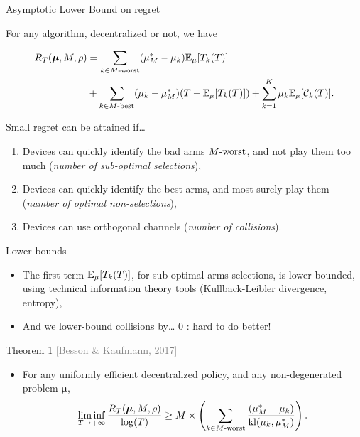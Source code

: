 \documentclass[12pt,english,ignorenonframetext,aspectratio=169,]{beamer}
\providecommand{\tightlist}{%
  \setlength{\itemsep}{0pt}\setlength{\parskip}{0pt}}
\begin{document}
\begin{frame}[allowframebreaks]{Asymptotic Lower Bound on regret}

For any algorithm, decentralized or not, we have \vspace*{-20pt}

\begin{small}\begin{align*}
R_T(\boldsymbol{\mu}, M, \rho) &= \sum_{k \in M\text{-}\mathrm{worst}} (\mu_M^* -  \mu_k) \mathbb{E}_{\mu}[T_k(T)] \\
&+ \sum_{k \in M\text{-}\mathrm{best}} (\mu_k -  \mu_M^*) (T - \mathbb{E}_{\mu}[T_k(T)]) + \sum_{k=1}^{K} \mu_k \mathbb{E}_{\mu}[\mathcal{C}_k(T)].
\end{align*}\end{small}

\begin{block}{Small regret can be attained if\ldots{}}

\begin{enumerate}
\def\labelenumi{\arabic{enumi}.}
\tightlist
\item
  Devices can quickly identify the bad arms \(M\text{-}\mathrm{worst}\), and not play
  them too much (\emph{number of sub-optimal selections}),
\item
  Devices can quickly identify the best arms, and most surely play them
  (\emph{number of optimal non-selections}),
\item
  Devices can use orthogonal channels (\emph{number of collisions}).
\end{enumerate}

\end{block}

\begin{block}{Lower-bounds}

\begin{itemize}
\tightlist
\item
  The first term \(\mathbb{E}_{\mu}[T_k(T)]\), for sub-optimal arms selections,
  is lower-bounded, using technical information theory tools
  (Kullback-Leibler divergence, entropy),
\item
  And we lower-bound collisions by\ldots{} \(0\) : hard to do better!
\end{itemize}

\end{block}

\begin{block}{Theorem 1
\hfill{}\textcolor{gray}{[Besson \& Kaufmann, 2017]}}

\begin{itemize}
\tightlist
\item
  For any uniformly efficient decentralized policy, and any
  non-degenerated problem \(\boldsymbol{\mu}\), \vspace*{-10pt}
  \[ \mathop{\lim\inf}\limits_{T \to +\infty} \frac{R_T(\boldsymbol{\mu}, M, \rho)}{\log(T)} \geq M \times \left( \sum_{k \in M\text{-}\mathrm{worst}} \frac{(\mu_M^* -  \mu_k)}{\mathrm{kl}(\mu_k, \mu_M^*)} \right) . \]
\end{itemize}


\end{block}
\end{frame}
\end{document}
